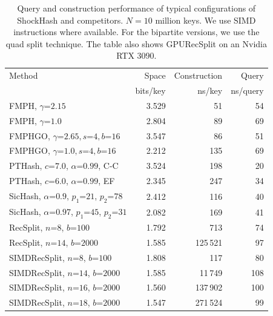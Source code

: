 \documentclass[a4paper,USenglish,cleveref]{lipics-v2021}
\begin{document}
\begin{table}[t]
  \caption{Query and construction performance of typical configurations of ShockHash and competitors.
    $N=10$ million keys.
    We use SIMD instructions where available.
    For the bipartite versions, we use the quad split technique.
    The table also shows GPURecSplit on an Nvidia RTX 3090.
    }
  \label{tab:queries}

\addtolength\tabcolsep{-2pt}
\small
\begin{centering}
\begin{tabular}[t]{l rrr}
    \toprule
    Method & Space & Construction & Query \\
           & bits/key & ns/key & ns/query \\ \midrule

                                     FMPH, $\gamma$=$2.15$ & 3.529 &          51 &  54 \\
                                      FMPH, $\gamma$=$1.0$ & 2.804 &          89 &  69 \\ \midrule
                    FMPHGO, $\gamma$=$2.65, s$=$4, b$=$16$ & 3.547 &          86 &  51 \\
                     FMPHGO, $\gamma$=$1.0, s$=$4, b$=$16$ & 2.212 &         135 &  69 \\ \midrule
                   PTHash, $c$=$7.0$, $\alpha$=$0.99$, C-C & 3.524 &         198 &  20 \\
                    PTHash, $c$=$6.0$, $\alpha$=$0.99$, EF & 2.345 &         247 &  34 \\ \midrule
           SicHash, $\alpha$=$0.9$, $p_1$=$21$, $p_2$=$78$ & 2.412 &         116 &  40 \\
          SicHash, $\alpha$=$0.97$, $p_1$=$45$, $p_2$=$31$ & 2.082 &         169 &  41 \\ \midrule
                              RecSplit, $n$=$8$, $b$=$100$ & 1.792 &         713 &  74 \\
                            RecSplit, $n$=$14$, $b$=$2000$ & 1.585 &    125\,521 &  97 \\ \midrule
                          SIMDRecSplit, $n$=$8$, $b$=$100$ & 1.808 &         117 &  80 \\
                        SIMDRecSplit, $n$=$14$, $b$=$2000$ & 1.585 &     11\,749 & 108 \\
                        SIMDRecSplit, $n$=$16$, $b$=$2000$ & 1.560 &    137\,902 & 100 \\
                        SIMDRecSplit, $n$=$18$, $b$=$2000$ & 1.547 &    271\,524 &  99 \\

\end{tabular}
\end{centering}
\end{table}
\end{document}
